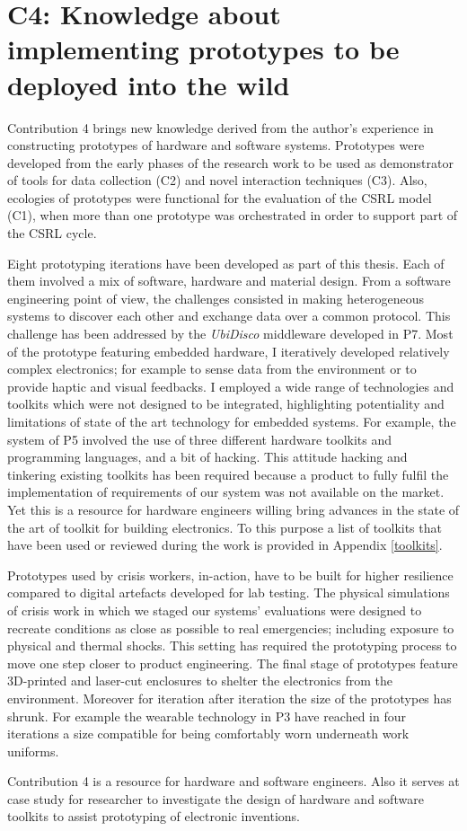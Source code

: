 \section[C4: Knowledge about implementing prototypes to be deployed into the wild][Contribution 4]{C4: Knowledge about implementing prototypes to be deployed into the wild}\label{c4-knowledge-about-implementing-prototypes-to-be-deployed-into-the-wild}

Contribution 4 brings new knowledge derived from the author's experience in constructing prototypes of hardware and software systems. Prototypes were developed from the early phases of the research work to be used as demonstrator of tools for data collection (C2) and novel interaction techniques (C3). Also, ecologies of prototypes were functional for the evaluation of the CSRL model (C1), when more than one prototype was orchestrated in order to support part of the CSRL cycle.

Eight prototyping iterations have been developed as part of this thesis. Each of them involved a mix of software, hardware and material design. From a software engineering point of view, the challenges consisted in making heterogeneous systems to discover each other and exchange data over a common protocol. This challenge has been addressed by the \emph{UbiDisco} middleware developed in P7. Most of the prototype featuring embedded hardware, I iteratively developed relatively complex electronics; for example to sense data from the environment or to provide haptic and visual feedbacks. I employed a wide range of technologies and toolkits which were not designed to be integrated, highlighting potentiality and limitations of state of the art technology for embedded systems. For example, the system of P5 involved the use of three different hardware toolkits and programming languages, and a bit of hacking. This attitude hacking and tinkering existing toolkits has been required because a product to fully fulfil the implementation of requirements of our system was not available on the market. Yet this is a resource for hardware engineers willing bring advances in the state of the art of toolkit for building electronics. To this purpose a list of toolkits that have been used or reviewed during the work is provided in Appendix \ref{toolkits}.

Prototypes used by crisis workers, in-action, have to be built for higher resilience compared to digital artefacts developed for lab testing. The physical simulations of crisis work in which we staged our systems' evaluations were designed to recreate conditions as close as possible to real emergencies; including exposure to physical and thermal shocks. This setting has required the prototyping process to move one step closer to product engineering. The final stage of prototypes feature 3D-printed and laser-cut enclosures to shelter the electronics from the environment. Moreover for iteration after iteration the size of the prototypes has shrunk. For example the wearable technology in P3 have reached in four iterations a size compatible for being comfortably worn underneath work uniforms.

Contribution 4 is a resource for hardware and software engineers. Also it serves at case study for researcher to investigate the design of hardware and software toolkits to assist prototyping of electronic inventions. 
